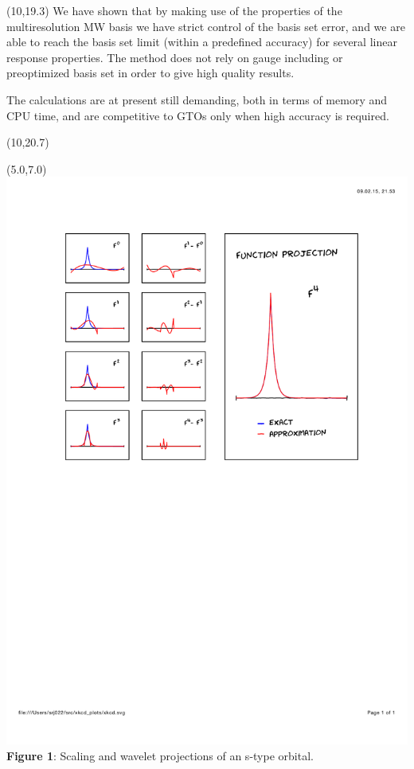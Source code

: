 \documentclass[a0,portrait]{a0poster}
\def\LHead#1{\noindent{\LARGE\color{DarkBlue} #1}\smallskip}
\begin{document}

\begin{textblock}{7}(10,19.3)
We have shown that by making use of the properties of the multiresolution
MW basis we have strict control of the basis set error, and we are able to 
reach the basis set limit (within a predefined accuracy) for several linear
response properties. The method does not rely on gauge including or 
preoptimized basis set in order to give high quality results.

The calculations are at present still demanding, both in terms of memory and CPU
time, and are competitive to GTOs only when high accuracy is required.
\end{textblock}

\begin{textblock}{7}(10,20.7)
\renewcommand\refname{\textnormal{\LHead{References}}}

%

\end{textblock}


\begin{textblock}{4.5}(5.0,7.0)
    \includegraphics[scale=1.3, viewport = 85 420 550 760, clip]{figures/func_rep_2.pdf}
    \footnotesize
    \centering
    \\\textbf{Figure 1}: Scaling and wavelet projections of an s-type orbital.
\end{textblock} 
\end{document}
